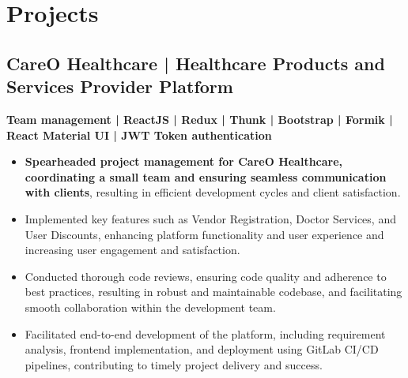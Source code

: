\documentclass[letterpaper]{deedy-resume} %
\begin{document}
\begin{minipage}[t]{0.66\textwidth} %



\section{Projects}

\subsection{CareO Healthcare | Healthcare Products and Services Provider Platform}

\textbf{Team management | ReactJS | Redux | Thunk | Bootstrap | Formik | React Material UI | JWT Token authentication} \\
\vspace{-\topsep}
\begin{itemize}
    \setlength\itemsep{-0.5em} %
    \item \textbf{Spearheaded project management for CareO Healthcare, coordinating a small team and ensuring seamless communication with clients}, resulting in efficient development cycles and client satisfaction.
    \item Implemented key features such as Vendor Registration, Doctor Services, and User Discounts, enhancing platform functionality and user experience and increasing user engagement and satisfaction.
    \item Conducted thorough code reviews, ensuring code quality and adherence to best practices, resulting in robust and maintainable codebase, and facilitating smooth collaboration within the development team.
    \item Facilitated end-to-end development of the platform, including requirement analysis, frontend implementation, and deployment using GitLab CI/CD pipelines, contributing to timely project delivery and success.
\end{itemize}



\end{minipage}
\end{document}
